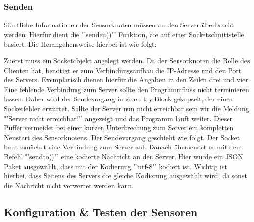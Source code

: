 \subsubsection*{Senden}\label{Sensorknoten:Senden}
	Sämtliche Informationen der Sensorknoten müssen an den Server überbracht werden. Hierfür dient die "'senden()"' Funktion, die auf einer Socketschnittstelle basiert. Die Herangehensweise hierbei ist wie folgt:
	
	Zuerst muss ein Socketobjekt angelegt werden. Da der Sensorknoten die Rolle des Clienten hat, benötigt er zum Verbindungsaufbau die IP-Adresse und den Port des Servers. Exemplarisch dienen hierfür die Angaben in den Zeilen drei und vier. Eine fehlende Verbindung zum Server sollte den Programmfluss nicht terminieren lassen. Daher wird der Sendevorgang in einen try Block gekapselt, der einen Socketfehler erwartet. Sollte der Server nun nicht erreichbar sein wir die Meldung "'Server nicht erreichbar!"' angezeigt und das Programm läuft weiter. Dieser Puffer vermeidet bei einer kurzen Unterbrechung zum Server ein kompletten Neustart des Sensorknotens. Der Sendevorgang geschieht wie folgt. Der Socket baut zunächst eine Verbindung zum Server auf. Danach übersendet es mit dem Befehl "'sendto()"' eine kodierte Nachricht an den Server. Hier wurde ein JSON Paket ausgewählt, dass mit der Kodierung "'utf-8"' kodiert ist. Wichtig ist hierbei, dass Seitens des Servers die gleiche Kodierung ausgewählt wird, da sonst die Nachricht nicht verwertet werden kann. 
\subsection{Konfiguration \& Testen der Sensoren}

